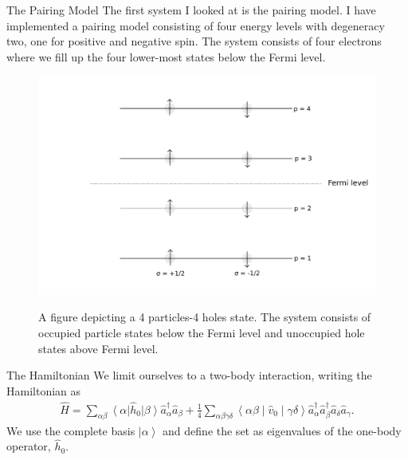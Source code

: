 \documentclass[twoside,english]{uiofysmaster}
\begin{document}
\begin{chapter}{The Pairing Model}
	The first system I looked at is the pairing model. I have
        implemented a pairing model consisting of four energy levels
        with degeneracy two, one for positive and negative spin. The
        system consists of four electrons where we fill up the four
        lower-most states below the Fermi level.
	\begin{figure}[h]
		\includegraphics[width=\textwidth]{Figures/Pairing_model.pdf}
		\label{PairingModel_1}
		\caption{A figure depicting a 4 particles-4 holes state. The system consists of occupied particle states below the Fermi level and unoccupied hole states above Fermi level.}
	\end{figure}
	
	\begin{section}{The Hamiltonian}
		We limit ourselves to a two-body interaction, writing the Hamiltonian as
		\begin{align}
			\hat H = \sum_{\alpha \beta} \left< \alpha \right| \hat h_0 \left| \beta \right> \hat a_{\alpha}^{\dagger} \hat a_{\beta} 
			        + \frac{1}{4} \sum_{\alpha \beta \gamma \delta} \left< \alpha \beta \middle| \hat v_0 \middle| \gamma \delta \right> \hat a_{\alpha}^{\dagger} \hat a_{\beta}^{\dagger} \hat a_{\delta} \hat a_{\gamma}.
		\end{align}
		We use the complete basis $\left| \alpha \right>$ and define the set as eigenvalues of the one-body operator, $\hat h_0$. 
		

\end{section}
\end{chapter}
\end{document}
